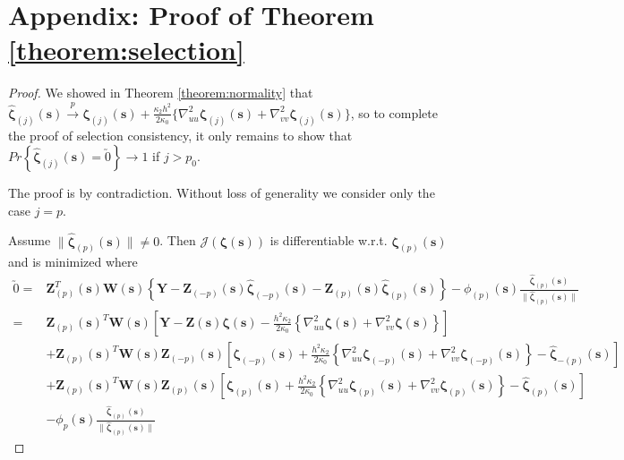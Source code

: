 \documentclass[authoryear,review, 12pt]{elsarticle}
\begin{document}
\section*{Appendix: Proof of Theorem \ref{theorem:selection}\label{sec:gaussian-selection-proof}}
\begin{proof}
We showed in Theorem \ref{theorem:normality} that $\hat{\bm{\zeta}}_{\left(j\right)}\left(\bm{s}\right)\xrightarrow{p}\bm{\zeta}_{\left(j\right)}\left(\bm{s}\right)+\frac{\kappa_{2}h^{2}}{2\kappa_{0}}\{\nabla_{uu}^{2}\bm{\zeta}_{\left(j\right)}\left(\bm{s}\right)+\nabla_{vv}^{2}\bm{\zeta}_{\left(j\right)}\left(\bm{s}\right)\}$,
so to complete the proof of selection consistency, it only remains
to show that $Pr\left\{ \hat{\bm{\zeta}}_{\left(j\right)}\left(\bm{s}\right)=\utilde{0}\right\} \to1$
if $j>p_{0}$.

The proof is by contradiction. Without loss of generality we consider
only the case $j=p$.

Assume $\|\hat{\bm{\zeta}}_{\left(p\right)}(\bm{s})\|\ne0$. Then
$\mathcal{J}\left(\bm{\zeta}\left(\bm{s}\right)\right)$ is differentiable
w.r.t. $\bm{\zeta}_{\left(p\right)}\left(\bm{s}\right)$ and is minimized
where 
\begin{align*}
\utilde{0}= & \bm{Z}_{\left(p\right)}^{T}\left(\bm{s}\right)\bm{W}\left(\bm{s}\right)\left\{ \bm{Y}-\bm{Z}_{\left(-p\right)}\left(\bm{s}\right)\hat{\bm{\zeta}}_{\left(-p\right)}\left(\bm{s}\right)-\bm{Z}_{\left(p\right)}\left(\bm{s}\right)\hat{\bm{\zeta}}_{\left(p\right)}\left(\bm{s}\right)\right\} -\phi_{\left(p\right)}(\bm{s})\frac{\hat{\bm{\zeta}}_{\left(p\right)}\left(\bm{s}\right)}{\|\hat{\bm{\zeta}}_{\left(p\right)}\left(\bm{s}\right)\|}\\
= & \bm{Z}_{\left(p\right)}\left(\bm{s}\right)^{T}\bm{W}\left(\bm{s}\right)\left[\bm{Y}-\bm{Z}\left(\bm{s}\right)\bm{\zeta}\left(\bm{s}\right)-\frac{h^{2}\kappa_{2}}{2\kappa_{0}}\left\{ \nabla_{uu}^{2}\bm{\zeta}\left(\bm{s}\right)+\nabla_{vv}^{2}\bm{\zeta}\left(\bm{s}\right)\right\} \right]\\
 & +\bm{Z}_{\left(p\right)}\left(\bm{s}\right)^{T}\bm{W}\left(\bm{s}\right)\bm{Z}_{\left(-p\right)}\left(\bm{s}\right)\left[\bm{\zeta}_{\left(-p\right)}\left(\bm{s}\right)+\frac{h^{2}\kappa_{2}}{2\kappa_{0}}\left\{ \nabla_{uu}^{2}\bm{\zeta}_{\left(-p\right)}\left(\bm{s}\right)+\nabla_{vv}^{2}\bm{\zeta}_{\left(-p\right)}\left(\bm{s}\right)\right\} -\hat{\bm{\zeta}}_{-\left(p\right)}\left(\bm{s}\right)\right]\\
 & +\bm{Z}_{\left(p\right)}\left(\bm{s}\right)^{T}\bm{W}\left(\bm{s}\right)\bm{Z}_{\left(p\right)}\left(\bm{s}\right)\left[\bm{\zeta}_{\left(p\right)}\left(\bm{s}\right)+\frac{h^{2}\kappa_{2}}{2\kappa_{0}}\left\{ \nabla_{uu}^{2}\bm{\zeta}_{\left(p\right)}\left(\bm{s}\right)+\nabla_{vv}^{2}\bm{\zeta}_{\left(p\right)}\left(\bm{s}\right)\right\} -\hat{\bm{\zeta}}_{\left(p\right)}\left(\bm{s}\right)\right]\\
 & -\phi_{p}\left(\bm{s}\right)\frac{\hat{\bm{\zeta}}_{\left(p\right)}\left(\bm{s}\right)}{\|\hat{\bm{\zeta}}_{\left(p\right)}\left(\bm{s}\right)\|}
\end{align*}



\end{proof}
\end{document}
